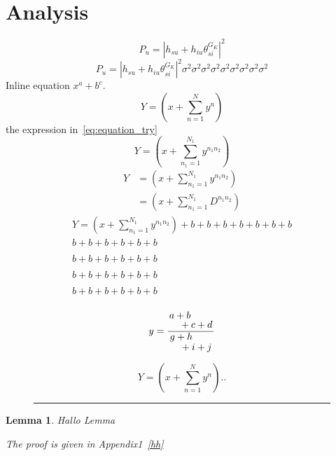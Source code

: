 \documentclass[journal]{IEEEtran}
\newtheorem{lemma}{{\bf Lemma}}
\begin{document}
\section{Analysis}
\blindtext
	\begin{equation}
		P_u = \left|h_{su}+h_{iu}\theta_{si}^{G_K}\right|^2
	\end{equation}
	\begin{equation}
		P_u\! =\!\left|h_{su}\!+\!h_{iu}\theta_{si}^{G_K}\right|^2
		\!\sigma^2\sigma^2\sigma^2\sigma^2\sigma^2\sigma^2\sigma^2\sigma^2\sigma^2
	\end{equation}
Inline equation
$x^a+b^c$.\blindtext
\begin{equation}
	Y = \left(x+\sum_{n=1}^Ny^n\right)
\end{equation}
the expression in~\eqref{eq:equation_try}
\begin{equation}
	Y = \left(x+\sum_{n_1=1}^{N_1}y^{{n_1}{n_2}}\right)
\end{equation}
\begin{align}		%
	Y& = \left(x+\sum_{n_1=1}^{N_1}y^{{n_1}{n_2}}\right) \nonumber\\
	 & = \left(x+\sum_{n_1=1}^{N_1}D^{{n_1}{n_2}}\right)
\end{align}
\begin{multline}
		Y = \left(x+\sum_{n_1=1}^{N_1}y^{{n_1}{n_2}}\right)+b+b+b+b+b+b+b\\
		b+b+b+b+b+b\\ \\
		b+b+b+b+b+b\\ \\
		b+b+b+b+b+b\\ \\
		b+b+b+b+b+b\\ \\
	\end{multline}
\begin{equation}
	y=\frac{\splitfrac{a+b}{+c+d}}{\splitfrac{g+h}{+i+j}}
\end{equation}
\begin{figure*}
	\begin{equation*}
		Y = \left(x+\sum_{n=1}^Ny^n\right)..
	\end{equation*}
\noindent\rule{\textwidth}{0.5pt}
\end{figure*}
\begin{lemma}
	Hallo Lemma \cite{fenton2001fault}
\begin{IEEEproof}
	The proof is given in Appendix1~\ref{hh}
	\end{IEEEproof}
\end{lemma}
\end{document}
